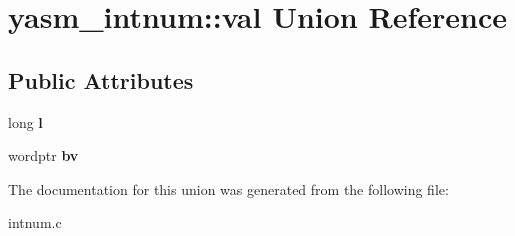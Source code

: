 \hypertarget{unionyasm__intnum_1_1val}{\section{yasm\-\_\-intnum\-:\-:val Union Reference}
\label{unionyasm__intnum_1_1val}
}
\subsection*{Public Attributes}
\begin{DoxyCompactItemize}
\item 
\hypertarget{unionyasm__intnum_1_1val_a6fce0c295d987cf47b1595441e510bb1}{long {\bfseries l}}\label{unionyasm__intnum_1_1val_a6fce0c295d987cf47b1595441e510bb1}

\item 
\hypertarget{unionyasm__intnum_1_1val_a19fdfd27f32b2d8151ee889e1dc48062}{wordptr {\bfseries bv}}\label{unionyasm__intnum_1_1val_a19fdfd27f32b2d8151ee889e1dc48062}

\end{DoxyCompactItemize}


The documentation for this union was generated from the following file\-:\begin{DoxyCompactItemize}
\item 
intnum.\-c\end{DoxyCompactItemize}
